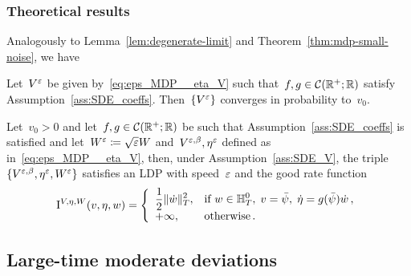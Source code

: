 \subsubsection{Theoretical results}

Analogously to Lemma~\ref{lem:degenerate-limit} and Theorem~\ref{thm:mdp-small-noise}, we have 
\begin{lemma} \label{lem:degenerate-limit-small}
Let~$V^{\varepsilon}$ be given by~\eqref{eq:eps_MDP__eta_V}
such that~$f,g\in\mathcal{C}(\mathbb{R}^+;  \mathbb{R})$ satisfy Assumption~\ref{ass:SDE_coeffs}. 
Then~$\{V^{\varepsilon}\}$ converges in probability to~$v_0$.
\end{lemma}



\begin{theorem}\label{mdp-small-time}
Let~$v_0>0$ and let~$f, g \in \mathcal{C}(\mathbb{R}^+;  \mathbb{R})$ be such that Assumption~\ref{ass:SDE_coeffs} is satisfied and let~$W^{\varepsilon} \coloneqq \sqrt{\varepsilon}W$ and~$V^{\varepsilon,\beta}, \eta^{\varepsilon}$ defined as in~\eqref{eq:eps_MDP__eta_V}, then, under Assumption~\ref{ass:SDE_V}, the triple
$\{V^{\varepsilon,\beta}, \eta^\varepsilon,W^\varepsilon\}$ satisfies an LDP with speed~$\varepsilon$ and the good rate function
\begin{equation*}
\mathrm{I}^{V,\eta,W}(v,\eta,w) = 
\left\{
\begin{array}{ll}
\displaystyle \frac{1}{2}\|\dot{w}\|_{T}^2, & \text{if }
\displaystyle 
w \in \mathbb{H}_T^0,\;
v = \bar\psi,\;
\dot{\eta} =  g(\bar\psi)\dot{w}\,,\\
+\infty, & \text{otherwise}\,.
\end{array}
\right.
\end{equation*}
\end{theorem}


\subsection{Large-time moderate deviations} \label{sec:largetimeMDP}

